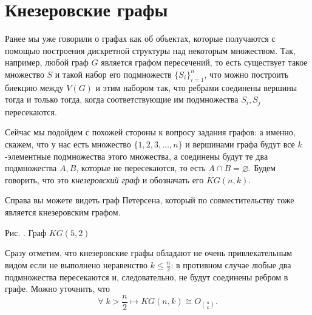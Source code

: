 \section{Кнезеровские графы}


	Ранее мы уже говорили о графах как об объектах, которые получаются с помощью построения дискретной структуры над некоторым множеством. Так, например, любой граф $G$ является графом пересечений, то есть существует такое множество $S$ и такой набор его подмножеств $\lbrace S_i \rbrace_{i=1}^{n}$, что можно построить биекцию между $V(G)$ и этим набором так, что ребрами соединены вершины тогда и только тогда, когда соответствующие им подмножества $S_i, S_j$ пересекаются.
	
	
\begin{paracol}{2}
	Сейчас мы подойдем с похожей стороны к вопросу задания графов: а именно, скажем, что у нас есть множество $\lbrace 1, 2, 3, \dots, n\rbrace$ и вершинами графа будут все $k$-элементные подмножества этого множества, а соединены будут те два подмножества $A, B$, которые не пересекаются, то есть $A \cap B = \varnothing$. Будем говорить, что это \emph{кнезеровский граф} и обозначать его $KG(n, k)$.
	
	Справа вы можете видеть граф Петерсена, который по совместительству тоже является кнезеровским графом.

\switchcolumn

\begin{center}\end{center}
\begin{center}
	\small Рис. \images. Граф $KG(5, 2)$
\end{center}
\end{paracol}

	Сразу отметим, что кнезеровские графы обладают не очень привлекательным видом если не выполнено неравенство $k \leqslant \frac{n}{2}$: в противном случае любые два подмножества пересекаются и, следовательно, не будут соединены ребром в графе. Можно уточнить, что 
	$$\forall \; k > \frac{n}{2} \mapsto KG(n, k) \cong O_{{n}\choose{k}}.$$
	
